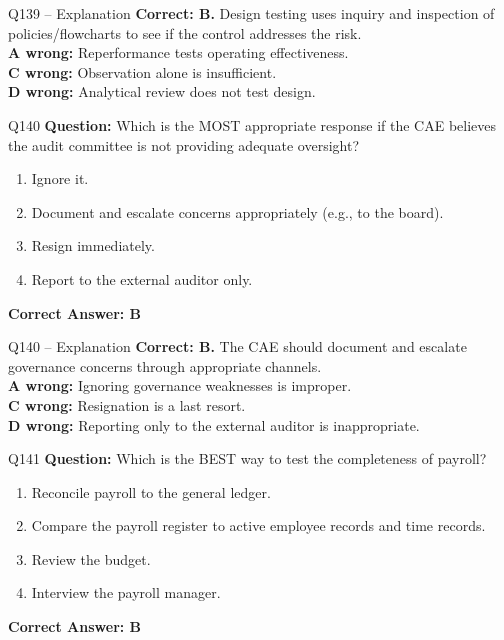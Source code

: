 \documentclass[aspectratio=169,10pt]{beamer}
\begin{document}
	\begin{frame}[t]{Q139 -- Explanation}
		\small
		\textbf{Correct: B.} Design testing uses inquiry and inspection of policies/flowcharts to see if the control addresses the risk. \\[4pt]
		\textbf{A wrong:} Reperformance tests operating effectiveness. \\[2pt]
		\textbf{C wrong:} Observation alone is insufficient. \\[2pt]
		\textbf{D wrong:} Analytical review does not test design.
	\end{frame}
	
	\begin{frame}[t]{Q140}
		\small
		\textbf{Question:} Which is the MOST appropriate response if the CAE believes the audit committee is not providing adequate oversight?
		\begin{enumerate}[label=\Alph*.,itemsep=1pt,topsep=2pt]
			\item Ignore it.
			\item Document and escalate concerns appropriately (e.g., to the board).
			\item Resign immediately.
			\item Report to the external auditor only.
		\end{enumerate}
		\vspace{4pt}
		\textbf{Correct Answer: B}
	\end{frame}
	
	\begin{frame}[t]{Q140 -- Explanation}
		\small
		\textbf{Correct: B.} The CAE should document and escalate governance concerns through appropriate channels. \\[4pt]
		\textbf{A wrong:} Ignoring governance weaknesses is improper. \\[2pt]
		\textbf{C wrong:} Resignation is a last resort. \\[2pt]
		\textbf{D wrong:} Reporting only to the external auditor is inappropriate.
	\end{frame}
	
	\begin{frame}[t]{Q141}
		\small
		\textbf{Question:} Which is the BEST way to test the completeness of payroll?
		\begin{enumerate}[label=\Alph*.,itemsep=1pt,topsep=2pt]
			\item Reconcile payroll to the general ledger.
			\item Compare the payroll register to active employee records and time records.
			\item Review the budget.
			\item Interview the payroll manager.
		\end{enumerate}
		\vspace{4pt}
		\textbf{Correct Answer: B}
	\end{frame}
	
\end{document}
